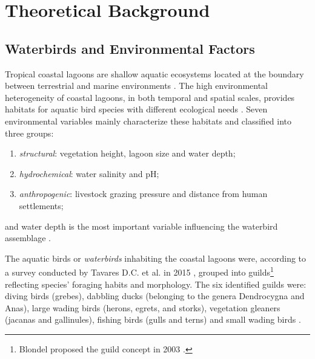 %
%
%
%


\section{Theoretical Background}

\subsection{Waterbirds and Environmental Factors}
Tropical coastal lagoons are shallow aquatic ecosystems located at the boundary between terrestrial and marine environments \cite{tavares2015environmental}. The high environmental heterogeneity of coastal lagoons, in both temporal and spatial scales, provides habitats for aquatic bird species with different ecological needs \cite{ntiamoa1998water, paracuellos2004factors, tavares2013inventory}. Seven environmental variables mainly characterize these habitats and classified into three groups:
 \begin{enumerate}
     \item \emph{structural}: vegetation height, lagoon size and water depth;
     \item \emph{hydrochemical}: water salinity and pH;
     \item \emph{anthropogenic}: livestock grazing pressure and distance from human settlements;
 \end{enumerate}
and water depth is the most important variable influencing the waterbird assemblage \cite{tavares2015environmental}.

The aquatic birds or \emph{waterbirds} inhabiting the coastal lagoons were, according to a survey conducted by Tavares D.C. et al. in 2015 \cite{tavares2015environmental}, grouped into guilds\footnote{ Blondel proposed the guild concept in 2003 \cite{blondel2003guilds}.} reflecting species' foraging habits and morphology. The six identified guilds were: diving birds (grebes), dabbling ducks (belonging to the genera Dendrocygna and Anas), large wading birds (herons, egrets, and storks), vegetation gleaners (jacanas and gallinules), fishing birds (gulls and terns) and small wading birds \cite{tavares2014variaccao}.

